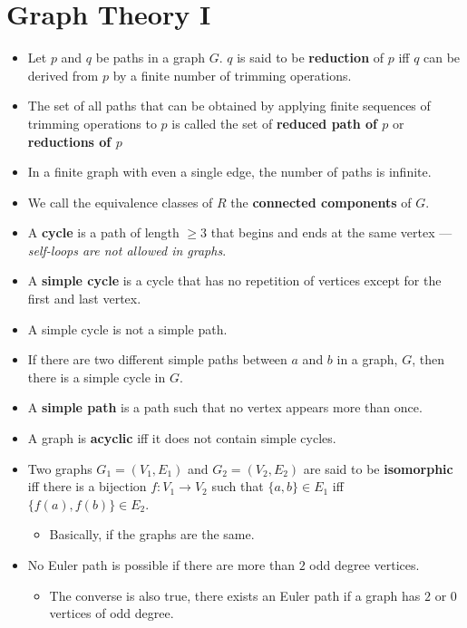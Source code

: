 \documentclass[12pt]{scrartcl}
\begin{document}
\section{Graph Theory I}
\begin{itemize}
    \item Let $p$ and $q$ be paths in a graph $G$. $q$ is said to be \textbf{reduction} of $p$ iff $q$ can be derived from $p$ by a finite number of trimming operations.
    \item The set of all paths that can be obtained by applying finite sequences of trimming operations to $p$ is called the set of \textbf{reduced path of $p$} or \textbf{reductions of $p$}
    \item In a finite graph with even a single edge, the number of paths is infinite.
    \item We call the equivalence classes of $R$ the \textbf{connected components} of $G$.
    \item A \textbf{cycle} is a path of length $\geq 3$ that begins and ends at the same vertex --- \textit{self-loops are not allowed in graphs}.
    \item A \textbf{simple cycle} is a cycle that has no repetition of vertices except for the first and last vertex.
    \item A simple cycle is not a simple path.
    \item If there are two different simple paths between $a$ and $b$ in a graph, $G$, then there is a simple cycle in $G$.
    \item A \textbf{simple path} is a path such that no vertex appears more than once.
    \item A graph is \textbf{acyclic} iff it does not contain simple cycles.
    \item Two graphs $G_1 = (V_1, E_1)$ and $G_2 = (V_2, E_2)$ are said to be \textbf{isomorphic} iff there is a bijection $f: V_1 \rightarrow V_2$ such that $\{a, b\} \in E_1$ iff $\{f(a), f(b)\} \in E_2$.
        \begin{itemize}
            \item Basically, if the graphs are the same.
        \end{itemize}

    \item No Euler path is possible if there are more than $2$ odd degree vertices.
        \begin{itemize}
            \item The converse is also true, there exists an Euler path if a graph has $2$ or $0$ vertices of odd degree.
        \end{itemize}
\end{itemize}
\end{document}
